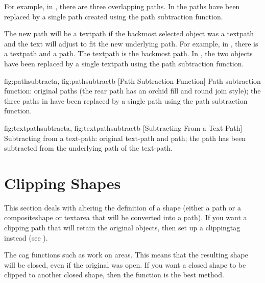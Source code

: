 For example, in
, there are three overlapping
paths.  In  the paths have been
replaced by a single path created using the path subtraction
function.

The new path will be a \gls*{textpath} if the backmost selected
object was a \gls*{textpath} and the text will adjust to fit the
new underlying path. For example, in
, there is a \gls*{textpath}
and a \gls*{path}. The \gls*{textpath} is the backmost path.
In , the two objects have
been replaced by a single \gls*{textpath} using the path subtraction
function.

{
  {fig:pathsubtracta}{}{},
  {fig:pathsubtractb}{}{}
}
[Path Subtraction Function]
{Path subtraction function:
 original paths (the rear path 
has an orchid fill  and round join style);
 the three paths 
in  have
been replaced by a single path using the path subtraction function.}

{
  {fig:textpathsubtracta}{}{},
  {fig:textpathsubtractb}{}{}
}
[Subtracting From a Text-Path]
{Subtracting from a text-path: 
 original text-path and path; 
 the path has been 
subtracted from the underlying path of the text-path.}


\section{Clipping Shapes}\label{sec:clippingshapes}

This section deals with altering the definition of a \gls{shape}
(either a \gls{path} or a \gls{compositeshape} or \gls{textarea}
that will be converted into a path).  If you want a
clipping path that will retain the original \glspl{object}, then set up a
\gls{clippingtag} instead (see ).

The \gls{cag} functions such as  work on
areas. This means that the resulting shape will be closed, even if
the original was open. If you want a closed shape to be clipped to
another closed shape, then the  function is
the best method.


